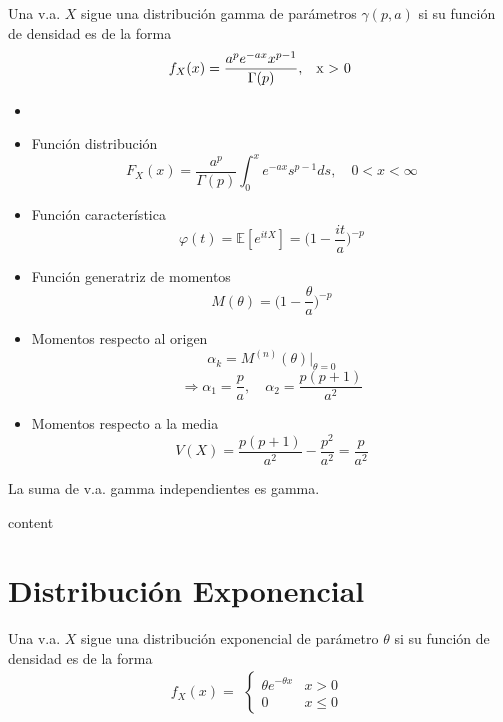 \begin{defn}
  Una v.a. $X$ sigue una distribución gamma de parámetros $\gamma(p, a)$ si su función de densidad es de la forma 
  \[ 
    f_{X}(x) = \frac{a^{p} e^{-ax} x^{p-1}}{\Gamma(p)}, \quad $x > 0$
  \] 
\end{defn}

\begin{prop}
  \begin{itemize}
    \item []
    \item Función distribución
      \[ 
        F_{X}(x) = \frac{a^{p}}{\Gamma(p)} \int_{0}^{x} e^{-ax} s^{p-1} ds, \quad 0 < x < \infty 
      \] 
    \item Función característica
      \[ 
        \varphi(t) = \mathbb{E} [ e^{itX} ]  = \Big ( 1 - \frac{it}{a} \Big )^{-p}
      \] 
    \item Función generatriz de momentos
      \[ 
        M(\theta) = \Big ( 1 - \frac{\theta}{a} \Big )^{-p} 
      \] 
    \item Momentos respecto al origen
      \[ 
        \alpha_{k} = M^{(n)}(\theta) \Big|_{\theta = 0} 
      \] 
      \[ 
        \Rightarrow \alpha_{1} = \frac{p}{a}, \quad \alpha_{2} = \frac{p(p+1)}{a^{2}}
      \] 
    \item Momentos respecto a la media
      \[ 
        V(X) = \frac{p(p + 1)}{a^{2}} - \frac{p ^{2}}{a^{2}} = \frac{p}{a^{2}} 
      \] 
  \end{itemize}
\end{prop}

\begin{theo}
  La suma de v.a. gamma independientes es gamma.
\end{theo}

\begin{dem}
  content
\end{dem}


\section{Distribución Exponencial}

\begin{defn}
  Una v.a. $X$ sigue una distribución exponencial de parámetro $\theta$ si su función de densidad es de la forma
  \[ 
    f_{X}(x) =
    \begin{aligned}
      \begin{cases}
        \theta e^{-\theta x} & x > 0 \\
        0 & x \leq 0
      \end{cases}
    \end{aligned} 
  \] 
\end{defn}

